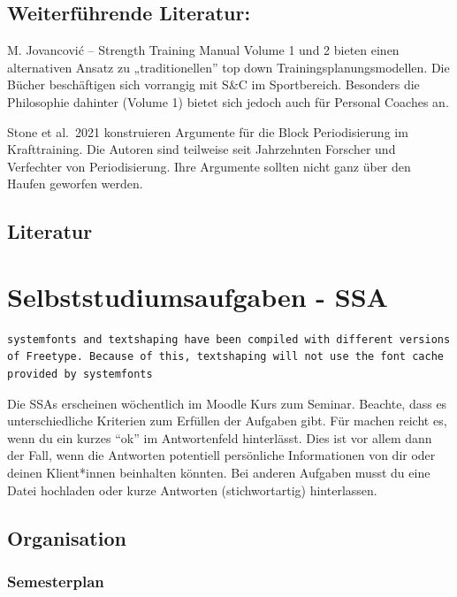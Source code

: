 \documentclass[
  letterpaper,
  DIV=11,
  numbers=noendperiod]{scrreprt}
\begin{document}
\section{Weiterführende Literatur:}\label{weiterfuxfchrende-literatur-1}

M. Jovancović -- Strength Training Manual Volume 1 und 2 bieten einen
alternativen Ansatz zu „traditionellen'' top down
Trainingsplanungsmodellen. Die Bücher beschäftigen sich vorrangig mit
S\&C im Sportbereich. Besonders die Philosophie dahinter (Volume 1)
bietet sich jedoch auch für Personal Coaches an.

Stone et al.~2021 konstruieren Argumente für die Block Periodisierung im
Krafttraining. Die Autoren sind teilweise seit Jahrzehnten Forscher und
Verfechter von Periodisierung. Ihre Argumente sollten nicht ganz über
den Haufen geworfen werden.

\section{Literatur}\label{literatur-10}


\chapter{Selbststudiumsaufgaben -
SSA}\label{selbststudiumsaufgaben---ssa}

\begin{verbatim}
systemfonts and textshaping have been compiled with different versions of Freetype. Because of this, textshaping will not use the font cache provided by systemfonts
\end{verbatim}

Die SSAs erscheinen wöchentlich im Moodle Kurs zum Seminar. Beachte,
dass es unterschiedliche Kriterien zum Erfüllen der Aufgaben gibt. Für
machen reicht es, wenn du ein kurzes ``ok'' im Antwortenfeld
hinterlässt. Dies ist vor allem dann der Fall, wenn die Antworten
potentiell persönliche Informationen von dir oder deinen Klient*innen
beinhalten könnten. Bei anderen Aufgaben musst du eine Datei hochladen
oder kurze Antworten (stichwortartig) hinterlassen.

\section{Organisation}\label{organisation}

\subsection{Semesterplan}\label{semesterplan}
\end{document}
